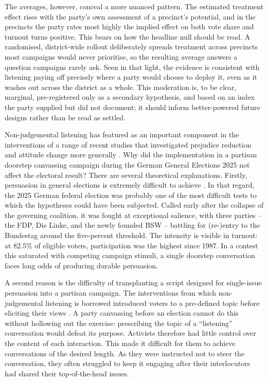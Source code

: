 \documentclass[11pt,a4paper]{scrartcl}
\begin{document}
The averages, however, conceal a more nuanced pattern. The estimated treatment effect rises with the party's own assessment of a precinct's potential, and in the precincts the party rates most highly the implied effect on both vote share and turnout turns positive. This bears on how the headline null should be read. A randomised, district-wide rollout deliberately spreads treatment across precincts most campaigns would never prioritise, so the resulting average answers a question campaigns rarely ask. Seen in that light, the evidence is consistent with listening paying off precisely where a party would choose to deploy it, even as it washes out across the district as a whole. This moderation is, to be clear, marginal, pre-registered only as a secondary hypothesis, and based on an index the party supplied but did not document; it should inform better-powered future designs rather than be read as settled.

Non-judgemental listening has featured as an important component in the interventions of a range of recent studies that investigated prejudice reduction and attitude change more generally \autocites{kallaReducingExclusionaryAttitudes2020}{broockmanDurablyReducingTransphobia2016}. Why did the implementation in a partisan doorstep canvassing campaign during the German General Elections 2025 not affect the electoral result? There are several theoretical explanations. Firstly,  persuasion in general elections is extremely difficult to achieve \autocite{kallaMinimalPersuasiveEffects2018}. In that regard, the 2025 German federal election was probably one of the most difficult tests to which the hypotheses could have been subjected. Called early after the collapse of the governing coalition, it was fought at exceptional salience, with three parties -- the FDP, Die Linke, and the newly founded BSW -- battling for (re-)entry to the Bundestag around the five-percent threshold. The intensity is visible in turnout: at 82.5\% of eligible voters, participation was the highest since 1987. In a contest this saturated with competing campaign stimuli, a single doorstep conversation faces long odds of producing durable persuasion.

A second reason is the difficulty of transplanting a script designed for single-issue persuasion into a partisan campaign. The interventions from which non-judgemental listening is borrowed introduced voters to a pre-defined topic before eliciting their views \autocites{kallaReducingExclusionaryAttitudes2020}{broockmanDurablyReducingTransphobia2016}. A party canvassing before an election cannot do this without hollowing out the exercise: prescribing the topic of a \enquote{listening} conversation would defeat its purpose. Activists therefore had little control over the content of each interaction. This made it difficult for them to achieve conversations of the desired length. As they were instructed not to steer the conversation, they often struggled to keep it engaging after their interlocutors had shared their top-of-the-head issues.
\end{document}
